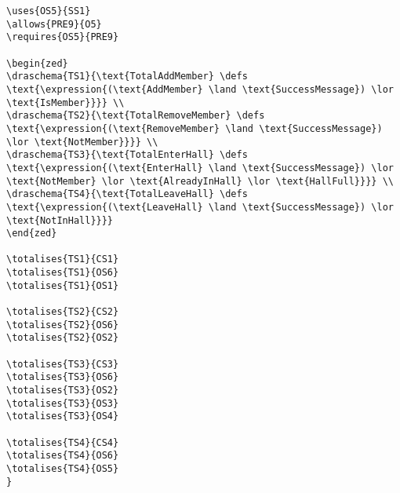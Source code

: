 \begin{verbatim}
\uses{OS5}{SS1}
\allows{PRE9}{O5}
\requires{OS5}{PRE9}

\begin{zed}
\draschema{TS1}{\text{TotalAddMember} \defs \text{\expression{(\text{AddMember} \land \text{SuccessMessage}) \lor \text{IsMember}}}} \\
\draschema{TS2}{\text{TotalRemoveMember} \defs \text{\expression{(\text{RemoveMember} \land \text{SuccessMessage}) \lor \text{NotMember}}}} \\
\draschema{TS3}{\text{TotalEnterHall} \defs \text{\expression{(\text{EnterHall} \land \text{SuccessMessage}) \lor \text{NotMember} \lor \text{AlreadyInHall} \lor \text{HallFull}}}} \\
\draschema{TS4}{\text{TotalLeaveHall} \defs \text{\expression{(\text{LeaveHall} \land \text{SuccessMessage}) \lor \text{NotInHall}}}}
\end{zed}

\totalises{TS1}{CS1}
\totalises{TS1}{OS6}
\totalises{TS1}{OS1}

\totalises{TS2}{CS2}
\totalises{TS2}{OS6}
\totalises{TS2}{OS2}

\totalises{TS3}{CS3}
\totalises{TS3}{OS6}
\totalises{TS3}{OS2}
\totalises{TS3}{OS3}
\totalises{TS3}{OS4}

\totalises{TS4}{CS4}
\totalises{TS4}{OS6}
\totalises{TS4}{OS5}
}


\end{verbatim}